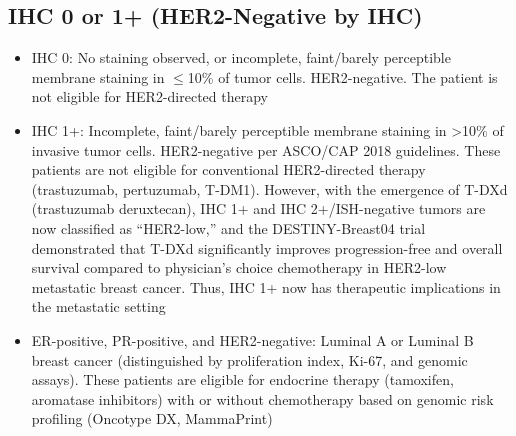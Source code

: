 \subsection*{IHC 0 or 1+ (HER2-Negative by IHC)}
\begin{itemize}
  \item IHC 0: No staining observed, or incomplete, faint/barely perceptible membrane staining in $\leq$10\% of tumor cells. HER2-negative. The patient is not eligible for HER2-directed therapy
  \item IHC 1+: Incomplete, faint/barely perceptible membrane staining in >10\% of invasive tumor cells. HER2-negative per ASCO/CAP 2018 guidelines. These patients are not eligible for conventional HER2-directed therapy (trastuzumab, pertuzumab, T-DM1). However, with the emergence of T-DXd (trastuzumab deruxtecan), IHC 1+ and IHC 2+/ISH-negative tumors are now classified as ``HER2-low,'' and the DESTINY-Breast04 trial demonstrated that T-DXd significantly improves progression-free and overall survival compared to physician's choice chemotherapy in HER2-low metastatic breast cancer. Thus, IHC 1+ now has therapeutic implications in the metastatic setting
  \item ER-positive, PR-positive, and HER2-negative: Luminal A or Luminal B breast cancer (distinguished by proliferation index, Ki-67, and genomic assays). These patients are eligible for endocrine therapy (tamoxifen, aromatase inhibitors) with or without chemotherapy based on genomic risk profiling (Oncotype DX, MammaPrint)
\end{itemize}

